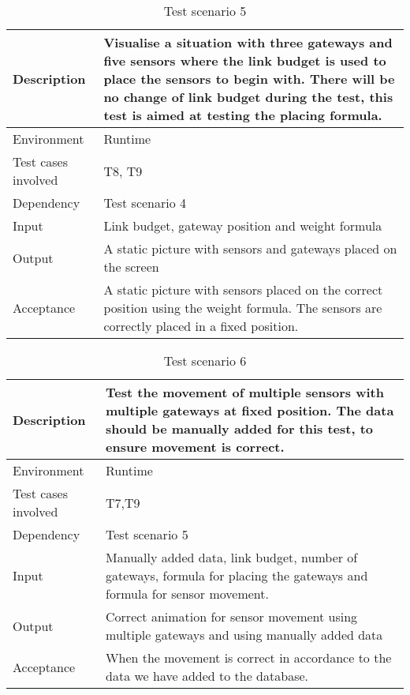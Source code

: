 \documentclass[../document]{subfiles}
\begin{document}
\begin{table}[H]
\caption{Test scenario 5}
\centering
\begin{tabularx}{\textwidth}{|L{3cm}|X|}
	\hline
	Description
	&Visualise a situation with three gateways and five sensors where the link budget is used to place the sensors to begin with. There will be no change of link budget during the test, this test is aimed at testing the placing formula.
	\\ \hline Environment
	&Runtime
	\\ \hline Test cases involved
	&T8, T9
	\\ \hline Dependency
	&Test scenario 4
	\\ \hline Input
	&Link budget, gateway position and weight formula
	\\ \hline Output
	&A static picture with sensors and gateways placed on the screen
	\\ \hline Acceptance
	&A static picture with sensors placed on the correct position using the weight formula. The sensors are correctly placed in a fixed position.
	\\ \hline 
\end{tabularx}
\end{table}

\begin{table}[H]
\caption{Test scenario 6}
\centering
\begin{tabularx}{\textwidth}{|L{3cm}|X|}
	\hline
	Description
	&Test the movement of multiple sensors with multiple gateways at fixed position. The data should be manually added for this test, to ensure movement is correct.
	\\ \hline Environment
	&Runtime
	\\ \hline Test cases involved
	&T7,T9
	\\ \hline Dependency
	&Test scenario 5
	\\ \hline Input
	&Manually added data, link budget, number of gateways, formula for placing the gateways and formula for sensor movement. 
	\\ \hline Output
	&Correct animation for sensor movement using multiple gateways and using manually added data
	\\ \hline Acceptance
	&When the movement is correct in accordance to the data we have added to the database.
	\\ \hline 
\end{tabularx}
\end{table}
\end{document}
